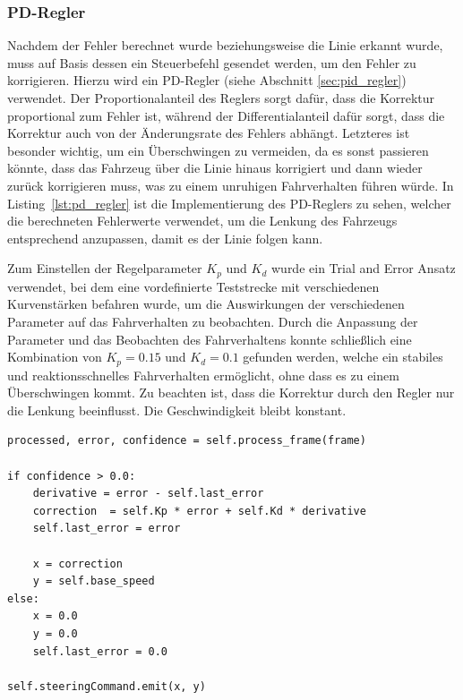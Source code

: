         \subsubsection{PD-Regler}
        Nachdem der Fehler berechnet wurde beziehungsweise die Linie erkannt wurde, muss auf Basis dessen ein Steuerbefehl gesendet werden, um den Fehler zu korrigieren. Hierzu wird ein PD-Regler (siehe Abschnitt \ref{sec:pid_regler}) verwendet. Der Proportionalanteil des Reglers sorgt dafür, dass die Korrektur proportional zum Fehler ist, während der Differentialanteil dafür sorgt, dass die Korrektur auch von der Änderungsrate des Fehlers abhängt. Letzteres ist besonder wichtig, um ein Überschwingen zu vermeiden, da es sonst passieren könnte, dass das Fahrzeug über die Linie hinaus korrigiert und dann wieder zurück korrigieren muss, was zu einem unruhigen Fahrverhalten führen würde. In Listing~\ref{lst:pd_regler} ist die Implementierung des PD-Reglers zu sehen, welcher die berechneten Fehlerwerte verwendet, um die Lenkung des Fahrzeugs entsprechend anzupassen, damit es der Linie folgen kann.

        Zum Einstellen der Regelparameter $ K_p $ und $ K_d $ wurde ein Trial and Error Ansatz verwendet, bei dem eine vordefinierte Teststrecke mit verschiedenen Kurvenstärken befahren wurde, um die Auswirkungen der verschiedenen Parameter auf das Fahrverhalten zu beobachten. Durch die Anpassung der Parameter und das Beobachten des Fahrverhaltens konnte schließlich eine Kombination von $ K_p = 0.15 $ und $ K_d = 0.1 $ gefunden werden, welche ein stabiles und reaktionsschnelles Fahrverhalten ermöglicht, ohne dass es zu einem Überschwingen kommt. Zu beachten ist, dass die Korrektur durch den Regler nur die Lenkung beeinflusst. Die Geschwindigkeit bleibt konstant.

        \begin{lstlisting}[caption={Berechnung des Regelfehlers}, label={lst:pd_regler}]
processed, error, confidence = self.process_frame(frame)

if confidence > 0.0:
    derivative = error - self.last_error
    correction  = self.Kp * error + self.Kd * derivative
    self.last_error = error
    
    x = correction
    y = self.base_speed
else:
    x = 0.0
    y = 0.0
    self.last_error = 0.0

self.steeringCommand.emit(x, y)
        \end{lstlisting}